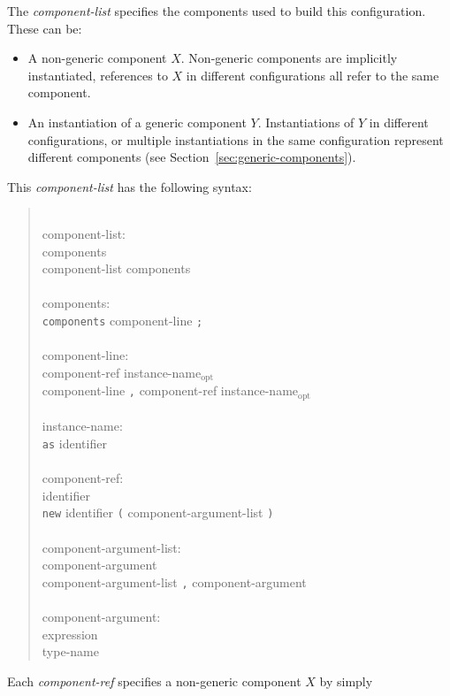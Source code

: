 \documentclass[11pt,letterpaper]{article}
\newcommand{\kw}[1]{{\tt #1}}
\newcommand{\opt}{$_{\mbox{opt}}$\xspace}
\newcommand{\grammarshift}{\vspace*{-.7cm}}
\newcommand{\grammarindent}{\hspace*{2cm}\= \\ \kill}
\begin{document}
The \emph{component-list} specifies the components used to build this
configuration. These can be:
\begin{itemize}
\item A non-generic component $X$. Non-generic components are implicitly
instantiated, references to $X$ in different configurations all
refer to the same component.

\item An instantiation of a generic component $Y$. Instantiations of $Y$ in
different configurations, or multiple instantiations in the same
configuration represent different components (see
Section~\ref{sec:generic-components}).
\end{itemize}

This \emph{component-list} has the following syntax:
\begin{quote} \grammarshift \em \begin{tabbing}
\grammarindent
component-list:\\
\>	components\\
\>	component-list components\\
\\
components:\\
\>	\kw{components} component-line \kw{;}\\
\\
component-line:\\
\>	component-ref instance-name\opt\\
\>	component-line \kw{,} component-ref instance-name\opt\\
\\
instance-name:\\
\>	\kw{as} identifier\\
\\
component-ref:\\
\>	identifier\\
\>	\kw{new} identifier \kw{(} component-argument-list \kw{)}\\
\\
component-argument-list:\\
\>	component-argument\\
\>	component-argument-list \kw{,} component-argument\\
\\
component-argument:\\
\>	expression\\
\>	type-name
\end{tabbing} \end{quote}
Each \emph{component-ref} specifies a non-generic component $X$ by simply
\end{document}
